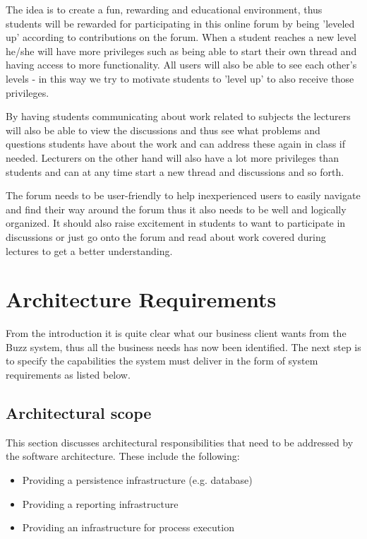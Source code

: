 \documentclass[a4paper]{article}
\begin{document}
The idea is to create a fun, rewarding and educational environment, thus students will be rewarded for participating in this online forum by being 'leveled up' according to contributions on the forum. When a student reaches a new level he/she will have more privileges such as being able to start their own thread and having access to more functionality. All users will also be able to see each other's levels - in this way we try to motivate students to 'level up' to also receive those privileges. 

By having students communicating about work related to subjects the lecturers will also be able to view the discussions and thus see what problems and questions students have about the work and can address these again in class if needed. Lecturers on the other hand will also have a lot more privileges than students and can at any time start a new thread and discussions and so forth. 

The forum needs to be user-friendly to help inexperienced users to easily navigate and find their way around the forum thus it also needs to be well and logically organized. It should also raise excitement in students to want to participate in discussions or just go onto the forum and read about work covered during lectures to get a better understanding. 



\section{Architecture Requirements}

From the introduction it is quite clear what our business client wants from the Buzz system, thus all the business needs has now been identified. The next step is to specify the capabilities the system must deliver in the form of system requirements as listed  below. 

\subsection{Architectural scope}
This section discusses architectural responsibilities that need to be addressed by the software
architecture. These include the following:

\begin{itemize}
\item Providing a persistence infrastructure (e.g. database)
\item Providing a reporting infrastructure
\item Providing an infrastructure for process execution
\end{itemize}
\end{document}
